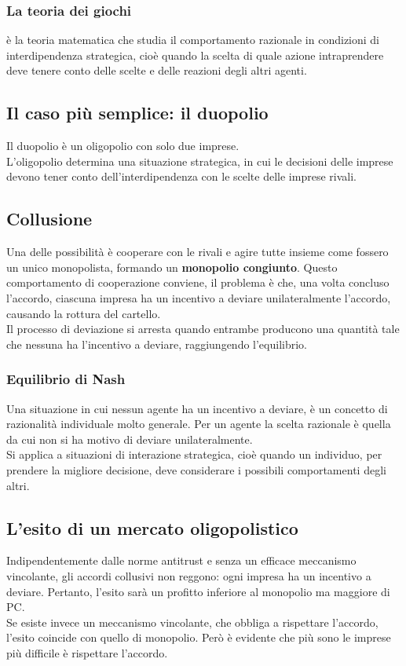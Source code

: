 \documentclass{report}
\begin{document}
	\subsubsection{La teoria dei giochi}
	è la teoria matematica che studia il comportamento razionale in condizioni di interdipendenza strategica, cioè quando la scelta di quale azione intraprendere deve tenere conto delle scelte e delle reazioni degli altri agenti.
	\subsection{Il caso più semplice: il duopolio}
	Il duopolio è un oligopolio con solo due imprese.
	\medskip \\
	L'oligopolio determina una situazione strategica, in cui le decisioni delle imprese devono tener conto dell'interdipendenza con le scelte delle imprese rivali.
	\subsection{Collusione}
	Una delle possibilità è cooperare con le rivali e agire tutte insieme come fossero un unico monopolista, formando un \textbf{monopolio congiunto}. Questo comportamento di cooperazione conviene, il problema è che, una volta concluso l'accordo, ciascuna impresa ha un incentivo a deviare unilateralmente l'accordo, causando la rottura del cartello.
	\medskip \\Il processo di deviazione si arresta quando entrambe producono una quantità tale che nessuna ha l'incentivo a deviare, raggiungendo l'equilibrio.
	\subsubsection{Equilibrio di Nash}
	Una situazione in cui nessun agente ha un incentivo a deviare, è un concetto di razionalità individuale molto generale. Per un agente la scelta razionale è quella da cui non si ha motivo di deviare unilateralmente.
	\medskip \\Si applica a situazioni di interazione strategica, cioè quando un individuo, per prendere la migliore decisione, deve considerare i possibili comportamenti degli altri.
	\subsection{L'esito di un mercato oligopolistico}
	Indipendentemente dalle norme antitrust e senza un efficace meccanismo vincolante, gli accordi collusivi non reggono: ogni impresa ha un incentivo a deviare. Pertanto, l'esito sarà un profitto inferiore al monopolio ma maggiore di PC.
	\medskip \\Se esiste invece un meccanismo vincolante, che obbliga a rispettare l'accordo, l'esito coincide con quello di monopolio. Però è evidente che più sono le imprese più difficile è rispettare l'accordo.
\end{document}
